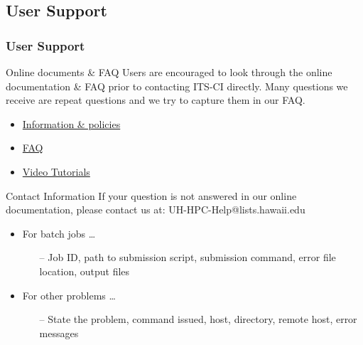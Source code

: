 \subsection{User Support}
\begin{frame}
  \frametitle{User Support}

  \begin{block}{Online documents \& FAQ}
    Users are encouraged to look through the online documentation \& FAQ prior to contacting ITS-CI directly.  Many questions we receive are repeat questions and we try to capture them in our FAQ.~\\
		\begin{itemize}
		\item \href{http://datascience.hawaii.edu/hpc/}{Information \& policies}
		\item \href{http://go.hawaii.edu/jdG}{FAQ}
		\item \href{http://go.hawaii.edu/3A8}{Video Tutorials}
		\end{itemize}
  \end{block}
  \begin{block}{Contact Information}
    If your question is not answered in our online documentation, please contact us at: UH-HPC-Help@lists.hawaii.edu
    
    \begin{itemize}
    \item For batch jobs \ldots
      \begin{itemize}
      \item[--] Job ID, path to submission script, submission command, error file location, output files
      \end{itemize} 
    \item For other problems \ldots
      \begin{itemize}
      \item[--] State the problem, command issued, host, directory, remote host, error messages
      \end{itemize}
    \end{itemize}
  \end{block}
\end{frame}


